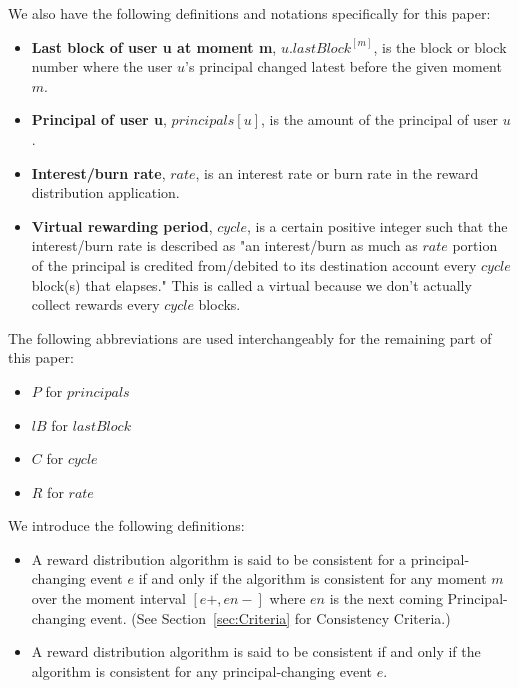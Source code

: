 \documentclass{article}
\begin{document}
We also have the following definitions and notations specifically for this paper:

\begin{itemize}
  \item \textbf{Last block of user u at moment m}, 
  $u.lastBlock^{[m]}$, is the block or block number where the user 
  $u$'s principal changed latest before the given moment $m$.
  \item {\textbf{Principal of user u}, $principals[u]$}, is the amount of the principal 
  of user $u$.
  \item {\textbf{Interest/burn rate}, $rate$}, is an interest rate or burn rate 
  in the reward distribution application.
  \item {\textbf{Virtual rewarding period}, $cycle$}, is a certain positive integer 
  such that the interest/burn rate is described as "an interest/burn as much 
  as $rate$ portion of the principal is credited from/debited to its destination 
  account every $cycle$ block(s) that elapses." This is called a virtual because 
  we don't actually collect rewards every $cycle$ blocks.
\end{itemize}

The following abbreviations are used interchangeably 
for the remaining part of this paper:

\begin{itemize}
  \item $P$ for $principals$
  \item $lB$ for $lastBlock$
  \item $C$ for $cycle$
  \item $R$ for $rate$
\end{itemize}

We introduce the following definitions: 

\label{sec:AlgorithmCorrectness}
\begin{itemize}
  \item A reward distribution algorithm is said to be consistent for 
  a principal-changing 
  event $e$ if and only if the algorithm is consistent for any moment $m$ 
  over the moment interval $[e+, en-]$ where $en$ is the next coming 
  Principal-changing event.
  (See Section~\ref{sec:Criteria} for Consistency Criteria.)
  \item A reward distribution algorithm is said to be consistent if and only if 
  the algorithm is consistent for any principal-changing event $e$.
\end{itemize}
\end{document}
